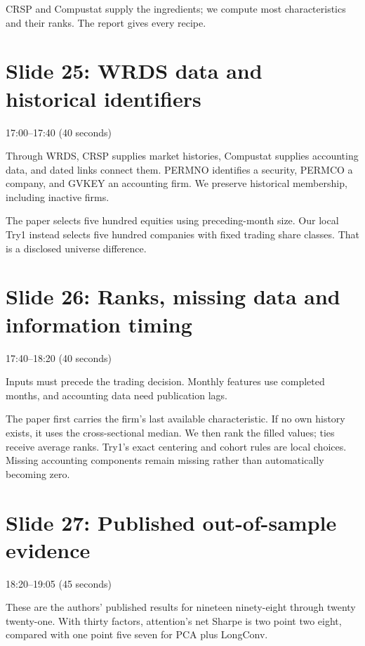 \documentclass[11pt]{article}
\begin{document}
CRSP and Compustat supply the ingredients; we compute most characteristics and their ranks. The report gives every recipe.

\section*{Slide 25: WRDS data and historical identifiers}

\textcolor{SBred}{17:00--17:40 (40 seconds)}

Through WRDS, CRSP supplies market histories, Compustat supplies accounting data, and dated links connect them. PERMNO identifies a security, PERMCO a company, and GVKEY an accounting firm. We preserve historical membership, including inactive firms.

The paper selects five hundred equities using preceding-month size. Our local Try1 instead selects five hundred companies with fixed trading share classes. That is a disclosed universe difference.

\section*{Slide 26: Ranks, missing data and information timing}

\textcolor{SBred}{17:40--18:20 (40 seconds)}

Inputs must precede the trading decision. Monthly features use completed months, and accounting data need publication lags.

The paper first carries the firm's last available characteristic. If no own history exists, it uses the cross-sectional median. We then rank the filled values; ties receive average ranks. Try1's exact centering and cohort rules are local choices. Missing accounting components remain missing rather than automatically becoming zero.

\section*{Slide 27: Published out-of-sample evidence}

\textcolor{SBred}{18:20--19:05 (45 seconds)}

These are the authors' published results for nineteen ninety-eight through twenty twenty-one. With thirty factors, attention's net Sharpe is two point two eight, compared with one point five seven for PCA plus LongConv.
\end{document}
